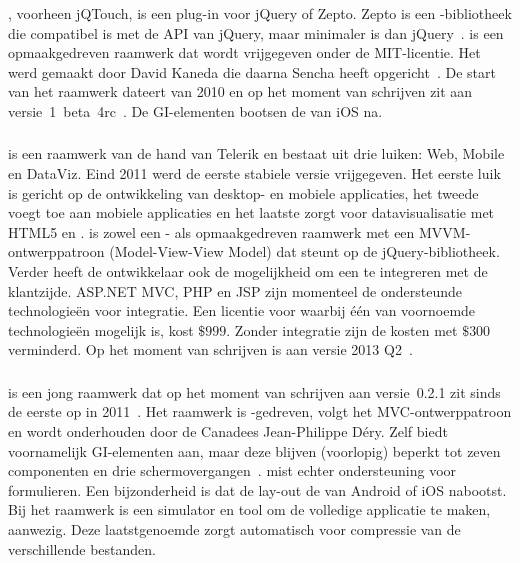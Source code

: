 \subsubsection{\jqt}%
\jqt{}, voorheen jQTouch, is een plug-in voor jQuery of Zepto.
Zepto is een \js{}-bibliotheek die compatibel is met de API van jQuery, maar minimaler is dan jQuery~\cite{Zepto2013}.
\jqt{} is een opmaakgedreven raamwerk dat wordt vrijgegeven onder de MIT-licentie.
Het werd gemaakt door David Kaneda die daarna Sencha heeft opgericht~\cite{JQT2013}.
De start van het raamwerk dateert van 2010 en op het moment van schrijven zit \jqt{} aan versie~1~beta~4rc~\cite{JQTouch2010,JQT2013}.
De GI-elementen bootsen de  van iOS na.

\subsubsection{\kendo} %
\kendo{} is een raamwerk van de hand van Telerik en bestaat uit drie luiken:  Web, Mobile en DataViz.
Eind 2011 werd de eerste stabiele versie vrijgegeven.
Het eerste luik is gericht op de ontwikkeling van desktop- en mobiele applicaties,  het tweede voegt  toe aan mobiele applicaties en het laatste zorgt voor datavisualisatie met HTML5 en \js{}.
\kendo{} is zowel een \js{}- als opmaakgedreven raamwerk met een MVVM-ontwerppatroon (Model-View-View Model) dat steunt op de jQuery-bibliotheek.
Verder heeft de ontwikkelaar ook de mogelijkheid om een  te integreren met de klantzijde.
ASP.NET MVC,  PHP en JSP zijn momenteel de ondersteunde technologieën voor  integratie.
Een licentie voor \kendo{} waarbij één van voornoemde technologieën mogelijk is, kost $\$999$.
Zonder  integratie zijn de kosten met $\$300$ verminderd.
Op het moment van schrijven is \kendo{} aan versie 2013 Q2~\cite{Telerike}.

\subsubsection{\moobile} %
\moobile{} is een jong raamwerk dat op het moment van schrijven aan versie~0.2.1 zit sinds de eerste  op \gh{} in 2011~\cite{Dery2013}.
Het raamwerk is \js{}-gedreven, volgt het MVC-ontwerppatroon en wordt onderhouden door de Canadees Jean-Philippe Déry.
Zelf biedt \moobile{} voornamelijk GI-elementen aan, maar deze blijven (voorlopig) beperkt tot zeven componenten en drie schermovergangen~\cite{Dery2013}.
\moobile{} mist echter ondersteuning voor formulieren.
Een bijzonderheid is dat de lay-out de  van Android of iOS nabootst.
Bij het raamwerk is een simulator en tool om de volledige applicatie te maken, aanwezig.
Deze laatstgenoemde zorgt automatisch voor compressie van de verschillende bestanden.

